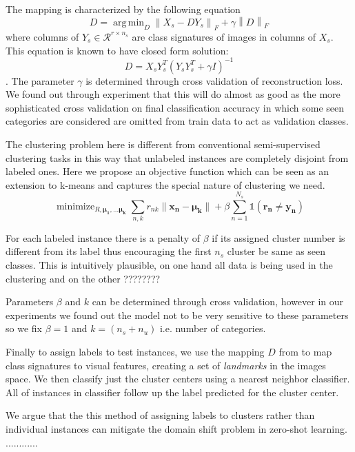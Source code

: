 \documentclass[wcp]{jmlr}
\newcommand{\norm}[1]{\left \lVert #1 \right \rVert_{F}}
\DeclareMathOperator*{\argmin}{arg\,min}
\DeclareMathOperator*{\minimize}{minimize}
\begin{document}
The mapping is characterized by the following equation
\begin{equation}
  D = \argmin_D \norm{X_s - D Y_s} + \gamma \norm{D}
\end{equation}
where columns of $ Y_s \in \mathcal{R}^{r \times n_s} $  are class signatures of images in columns of $X_s$.
This equation is known to have closed form solution:
\begin{equation} \label{eq:dic}
  D = X_s Y_s^T (Y_s Y_s^T + \gamma I)^{-1}
\end{equation}.
The parameter $\gamma$ is determined through cross validation of reconstruction loss. We found out through experiment that
this will do almost as good as the more sophisticated
 cross validation on final classification accuracy in which some seen categories are considered are omitted
 from train data to act as validation classes.

The clustering problem here is different from conventional semi-supervised clustering tasks \cite{}
in this way that unlabeled instances are completely disjoint from labeled ones. Here we propose an objective function which
can be seen as an extension to k-means and captures the special nature of clustering we need.
\begin{equation}
\minimize_{R, \mathbf{\mu_1, \ldots \mu_k }}  \sum_{n,k} r_{nk} \lVert \mathbf{x_n - \mu_k} \rVert +
 \beta \sum_{n=1}^{N_s} \mathds{1}(\mathbf{r_n \neq y_n})
\end{equation}

For each labeled instance there is a penalty of $\beta$ if its assigned cluster number is different from its label thus encouraging
the first $n_s$ cluster be same as seen classes. This is intuitively plausible, on one hand all data is being used
in the clustering and on the other ????????

Parameters $\beta$ and $k$ can be determined through cross validation, however in our experiments we found out
the model not to be very sensitive to these parameters so we fix $\beta=1$ and $k =  (n_s + n_u)$ i.e. number of categories.

Finally to assign labels to test instances, we use the mapping $D$ from  to map class signatures to visual
features, creating a set of \textit{landmarks} in the images space. We then classify just the cluster centers using a
nearest neighbor classifier. All of instances in classifier follow up the label predicted for the cluster center.

We argue that the this method of assigning labels to clusters rather than individual instances can mitigate the
domain shift problem in zero-shot learning.
............
\end{document}
